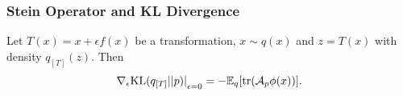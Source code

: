 \documentclass[aspectratio=169]{beamer}
\begin{document}
\begin{frame}
    \frametitle{Stein Operator and KL Divergence}
    Let $T(x) = x + \epsilon f(x)$ be a transformation, $x \sim q(x)$ and $z = T(x)$ with density $q_{[T]}(z)$. Then
    \begin{align*}
        {\nabla_{\epsilon}\textup{KL}(q_{[T]} \vert \vert p)\vert}_{\epsilon = 0} = - \mathbb{E}_q[\textup{tr}(\mathcal{A}_p\phi(x))].
    \end{align*}
\end{frame}
\end{document}
